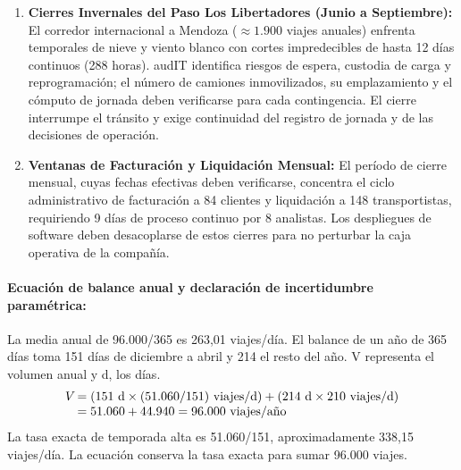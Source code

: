 \begin{enumerate}
\begin{itemize}
    \item \textit{Comportamiento de la flota de frío:} Los registros de viajes permitirán verificar la utilización y los destinos de los equipos refrigerados por temporada.
    \item \textit{Menor demanda relativa (Mayo a Agosto):} La menor demanda puede facilitar intervenciones. Para programarlas se deben cotejar la llegada efectiva de camiones, el calendario contractual y los congelamientos del caso.
  \end{itemize}
  \item \textbf{Cierres Invernales del Paso Los Libertadores (Junio a Septiembre):} El corredor internacional a Mendoza ($\approx 1.900$ viajes anuales) enfrenta temporales de nieve y viento blanco con cortes impredecibles de hasta 12 días continuos (288 horas). audIT identifica riesgos de espera, custodia de carga y reprogramación; el número de camiones inmovilizados, su emplazamiento y el cómputo de jornada deben verificarse para cada contingencia. El cierre interrumpe el tránsito y exige continuidad del registro de jornada y de las decisiones de operación.
  \item \textbf{Ventanas de Facturación y Liquidación Mensual:} El período de cierre mensual, cuyas fechas efectivas deben verificarse, concentra el ciclo administrativo de facturación a 84 clientes y liquidación a 148 transportistas, requiriendo 9 días de proceso continuo por 8 analistas. Los despliegues de software deben desacoplarse de estos cierres para no perturbar la caja operativa de la compañía.
\end{enumerate}

\paragraph{Ecuación de balance anual y declaración de incertidumbre paramétrica:}
La media anual de 96.000/365 es 263,01 viajes/día. El balance de un año de 365 días toma 151 días de diciembre a abril y 214 el resto del año. V representa el volumen anual y d, los días.
\begin{equation}
  \begin{array}{r@{\,}l}
    V & = (151\text{ d} \times (51.060/151)\text{ viajes/d}) + (214\text{ d} \times 210\text{ viajes/d}) \\
                    & = 51.060 + 44.940 = 96.000\text{ viajes/año}
  \end{array}
\end{equation}
La tasa exacta de temporada alta es 51.060/151, aproximadamente 338,15 viajes/día. La ecuación conserva la tasa exacta para sumar 96.000 viajes.

